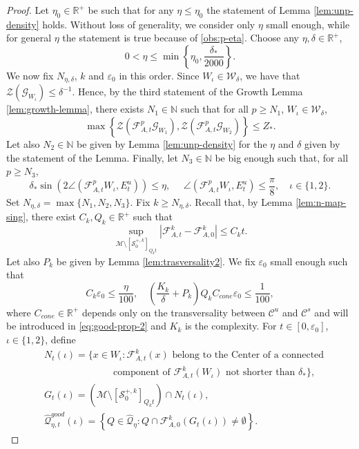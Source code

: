 \documentclass{amsart}
\numberwithin{equation}{section}
\newcommand\ve{\varepsilon}
\renewcommand{\ge}{\geqslant}
\renewcommand{\le}{\leqslant}
\newcommand\cF{{\mathcal F}}
\newcommand\cG{{\mathcal G}}
\newcommand\cM{{\mathcal M}}
\newcommand\cQ{{\mathcal Q}}
\newcommand\cS{{\mathcal S}}
\newcommand\cW{{\mathcal W}}
\newcommand\cZ{{\mathcal Z}}
\newcommand\bN{{\mathbb N}}
\newcommand\bR{{\mathbb R}}
\newcommand{\catt}{\cF_{A,t}}
\newcommand{\cato}{\cF_{A,0}}
\begin{document}
\begin{proof}
Let \(\eta_0 \in \bR^+\) be such that for any \(\eta \le \eta_0\) the statement of Lemma \ref{lem:unp-density} holds. Without loss of generality, we consider only \(\eta\) small enough, while for general \(\eta\) the statement is true because of \ref{obs:p-eta}. Choose any \(\eta, \delta \in \bR^+\),
\begin{equation}\label{eq:fix-eta-small-first-enc}
0 < \eta \le \min\left\{\eta_0, \frac{\delta_{*}}{2000}\right\}.
\end{equation}
We now fix \(N_{\eta, \delta}\), \(k\) and \(\ve_0\) in this order. Since \(W_{\iota} \in \cW_{\delta}\), we have that \(\cZ(\cG_{W_\iota}) \le \delta^{-1}\). Hence, by the third statement of the Growth Lemma \ref{lem:growth-lemma}, there exists \(N_1 \in \bN\) such that for all \(p \ge N_1\), \(W_{\iota} \in \cW_{\delta}\),
  \begin{equation}\label{eq:time-long-pieces}
    \max\left\{\cZ(\catt^{p}\cG_{W_1}), \cZ(\catt^{p}\cG_{W_2}) \right\} \le Z_{*}.
  \end{equation} 
  Let also \(N_2 \in \bN\) be given by Lemma \ref{lem:unp-density} for the \(\eta\) and \(\delta\) given by the statement of the Lemma. Finally, let \(N_3 \in \bN\) be big enough such that, for all \(p \ge N_3\),
  \begin{equation}\label{eq:K3-angle}
      \delta_{*}\sin\left (2\angle(\catt^{p}W_\iota, E_t^u) \right) \le \eta, \text{ } \text{ } \angle(\catt^{p}W_\iota, E_t^u) \le \frac{\pi}{8}, \quad  \iota \in\{1,2\}.
  \end{equation}
 Set \(N_{\eta, \delta} = \max\{N_1, N_2, N_3\}\). Fix \(k \ge N_{\eta, \delta}\). Recall that, by Lemma \ref{lem:n-map-sing}, there exist \(C_k, Q_k \in \bR^+\) such that 
  \begin{equation}\label{eq:distance-pert-unpert}
    \sup_{\cM \setminus [\cS_0^{+,k} ]_{Q_k t}} \left|\catt^k - \cato^k\right|\le C_k t.
  \end{equation}
Let also \(P_k\) be given by Lemma \ref{lem:trasversality2}. We fix \(\ve_0\) small enough such that 
\begin{equation}\label{eq:fixt_0}
  C_k \ve_0 \le \frac{\eta}{100},  \quad \left(\frac{K_k}{\delta} + P_k\right)Q_{k}C_{cone}\ve_0 \le \frac{1}{100},
\end{equation}
where \(C_{cone} \in \bR^+\) depends only on the transversality between \(\mathscr C^u\) and \(\mathscr C^s\) and will be introduced in \eqref{eq:good-prop-2} and \(K_k\) is the complexity. For \(t \in [0,\ve_0]\), \(\iota \in \{ 1,2\}\), define
\[
\begin{split}
&N_t (\iota) = \biggl\{x \in W_\iota: \catt^k (x) \text{ belong to the Center of a connected}\\
&   \hspace{3cm}\text{component of }\catt^k (W_\iota) \text{ not shorter than }\delta_{*}\biggr\},\\
& G_t (\iota) =\left( \cM \setminus [\cS_0^{+,k} ]_{Q_k t} \right) \cap  N_t (\iota), \\
&\widehat\cQ_{\eta, t}^{good} (\iota) = \left\{Q \in \widehat \cQ_{\eta}: Q \cap \cato^k \left(G_t (\iota)\right)\neq \emptyset\right\}.
\end{split}
\]


\end{proof}
\end{document}

